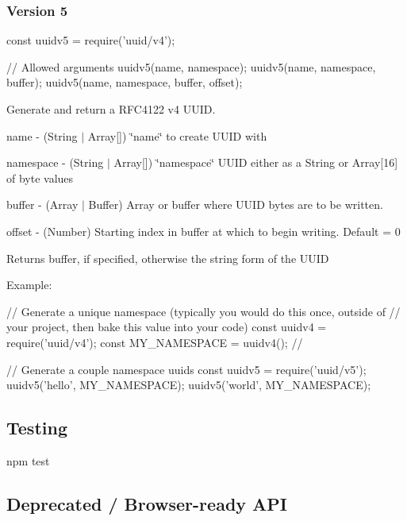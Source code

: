 \subsubsection*{Version 5}


\begin{DoxyCode}
const uuidv5 = require('uuid/v4');

// Allowed arguments
uuidv5(name, namespace);
uuidv5(name, namespace, buffer);
uuidv5(name, namespace, buffer, offset);
\end{DoxyCode}


Generate and return a R\+F\+C4122 v4 U\+U\+ID.


\begin{DoxyItemize}
\item {\ttfamily name} -\/ (String $\vert$ Array\mbox{[}\mbox{]}) \char`\"{}name\char`\"{} to create U\+U\+ID with
\item {\ttfamily namespace} -\/ (String $\vert$ Array\mbox{[}\mbox{]}) \char`\"{}namespace\char`\"{} U\+U\+ID either as a String or Array\mbox{[}16\mbox{]} of byte values
\item {\ttfamily buffer} -\/ (Array $\vert$ Buffer) Array or buffer where U\+U\+ID bytes are to be written.
\item {\ttfamily offset} -\/ (Number) Starting index in {\ttfamily buffer} at which to begin writing. Default = 0
\end{DoxyItemize}

Returns {\ttfamily buffer}, if specified, otherwise the string form of the U\+U\+ID

Example\+:


\begin{DoxyCode}
// Generate a unique  namespace (typically you would do this once, outside of
// your project, then bake this value into your code)
const uuidv4 = require('uuid/v4');
const MY\_NAMESPACE = uuidv4();  //

// Generate a couple namespace uuids
const uuidv5 = require('uuid/v5');
uuidv5('hello', MY\_NAMESPACE);
uuidv5('world', MY\_NAMESPACE);
\end{DoxyCode}


\subsection*{Testing}


\begin{DoxyCode}
npm test
\end{DoxyCode}


\subsection*{Deprecated / Browser-\/ready A\+PI}

